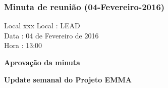 \subsubsection{Minuta de reunião (04-Fevereiro-2016)}

\begin{tabbing}
  Local \= xxx \kill
  Local \> : LEAD \\
  Data  \> : 04 de Fevereiro de 2016 \\
  Hora  \> : 13:00
\end{tabbing}


\textbf{Aprovação da minuta}

\textbf{Update semanal do Projeto EMMA}

